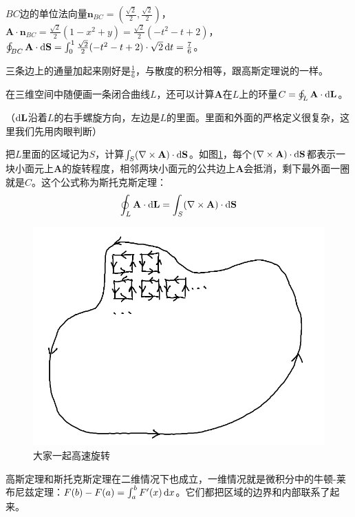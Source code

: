 $BC$边的单位法向量$\mathbf{n}_{BC}=(\frac{\sqrt{2}}{2},\frac{\sqrt{2}}{2})$，$\mathbf{A} \cdot \mathbf{n}_{BC}=\frac{\sqrt{2}}{2}(1-x^2+y)=\frac{\sqrt{2}}{2}(-t^2-t+2)$，$\oint_{BC} \mathbf{A} \cdot \mathop{}\!\mathrm{d} \mathbf{S}=\int_0^1 \frac{\sqrt{2}}{2}(-t^2-t+2) \cdot \sqrt{2} \mathop{}\!\mathrm{d} t=\frac{7}{6}$。

三条边上的通量加起来刚好是$\frac{1}{6}$，与散度的积分相等，跟高斯定理说的一样。

在三维空间中随便画一条闭合曲线$L$，还可以计算$\mathbf{A}$在$L$上的环量$C=\oint_L \mathbf{A} \cdot \mathop{}\!\mathrm{d} \mathbf{L}$。

（$\mathop{}\!\mathrm{d} \mathbf{L}$沿着$L$的右手螺旋方向，左边是$L$的里面。里面和外面的严格定义很复杂，这里我们先用肉眼判断）

把$L$里面的区域记为$S$，计算$\int_S (\nabla \times \mathbf{A}) \cdot \mathop{}\!\mathrm{d} \mathbf{S}$。如图\ref{fig-stokes-prove}，每个$(\nabla \times \mathbf{A}) \cdot \mathop{}\!\mathrm{d} \mathbf{S}$都表示一块小面元上$\mathbf{A}$的旋转程度，相邻两块小面元的公共边上$\mathbf{A}$会抵消，剩下最外面一圈就是$C$。这个公式称为斯托克斯定理：
\begin{equation*}
\oint_L \mathbf{A} \cdot \mathop{}\!\mathrm{d} \mathbf{L}=\int_S (\nabla \times \mathbf{A}) \cdot \mathop{}\!\mathrm{d} \mathbf{S}
\end{equation*}
\begin{figure}[htb]
\centering
\includegraphics[scale=0.5]{fig/stokes-prove}
\caption{大家一起高速旋转}
\label{fig-stokes-prove}
\end{figure}

高斯定理和斯托克斯定理在二维情况下也成立，一维情况就是微积分中的牛顿-莱布尼兹定理：$F(b)-F(a)=\int_a^b F'(x) \mathop{}\!\mathrm{d} x$。它们都把区域的边界和内部联系了起来。
